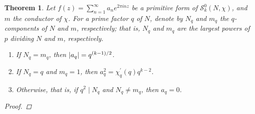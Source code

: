 \documentclass[10pt,leqno,twoside]{article}
\theoremstyle{plain}
\newtheorem{theorem}[lem]{Theorem}
\theoremstyle{definition}
\numberwithin{equation}{section}
\numberwithin{lem}{section}
\newcommand{\textib}[1]{\textbf{\textit{#1\index{#1}}}} %
\newcommand{\tbd}{{\Huge\color{red}{\textib{TBD}}}}
\begin{document}
\begin{theorem}\label{thm: miyake thm 4.6.17}
    Let $f(z) = \sum_{n=1}^\infty a_ne^{2\pi i nz}$ be a primitive form of $\mathcal S_k^0(N,\chi)$, and $m$ the conductor of $\chi$. For a prime factor $q$ of $N$, denote by $N_q$ and $m_q$ the $q$-components of $N$ and $m$, respectively; that is, $N_q$ and $m_q$ are the largest powers of $p$ dividing $N$ and $m$, respectively. \begin{enumerate}[label=\textup{(\arabic*)}]
        \item If $N_q = m_q$, then $\abs{a_q} = q^{(k-1)/2}$.
        \item If $N_q = q$ and $m_q = 1$, then $a_q^2 = \chi^\prime_q(q)q^{k-2}$.
        \item Otherwise, that is, if $q^2\mid N_q$ and $N_q \neq m_q$, then $a_q = 0$.
    \end{enumerate}
    \begin{proof}
        \tbd
    \end{proof}
\end{theorem}
\end{document}
